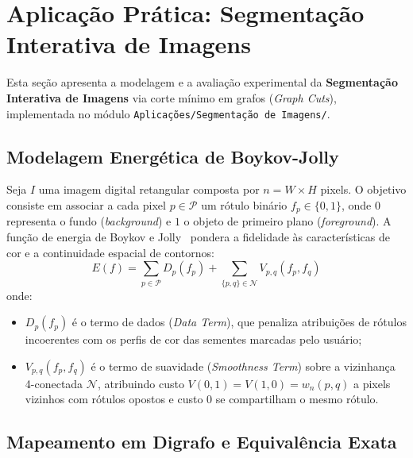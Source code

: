 \section{Aplicação Prática: Segmentação Interativa de Imagens}\label{sec:segmentacao}

Esta seção apresenta a modelagem e a avaliação experimental da \textbf{Segmentação Interativa de Imagens} via corte mínimo em grafos (\textit{Graph Cuts}), implementada no módulo \texttt{Aplicações/Segmentação de Imagens/}.

\subsection{Modelagem Energética de Boykov-Jolly}

Seja $I$ uma imagem digital retangular composta por $n = W \times H$ pixels. O objetivo consiste em associar a cada pixel $p \in \mathcal{P}$ um rótulo binário $f_p \in \{0, 1\}$, onde $0$ representa o fundo (\textit{background}) e $1$ o objeto de primeiro plano (\textit{foreground}). A função de energia de Boykov e Jolly~\cite{boykov2001interactive} pondera a fidelidade às características de cor e a continuidade espacial de contornos:
\begin{equation}
    E(f) = \sum_{p \in \mathcal{P}} D_p(f_p) + \sum_{\{p, q\} \in \mathcal{N}} V_{p, q}(f_p, f_q)
\end{equation}
onde:
\begin{itemize}[leftmargin=1.5em, itemsep=0.15em, topsep=0.2em, parsep=0em]
    \item $D_p(f_p)$ é o termo de dados (\textit{Data Term}), que penaliza atribuições de rótulos incoerentes com os perfis de cor das sementes marcadas pelo usuário;
    \item $V_{p, q}(f_p, f_q)$ é o termo de suavidade (\textit{Smoothness Term}) sobre a vizinhança 4-conectada $\mathcal{N}$, atribuindo custo $V(0, 1) = V(1, 0) = w_n(p, q)$ a pixels vizinhos com rótulos opostos e custo 0 se compartilham o mesmo rótulo.
\end{itemize}

\subsection{Mapeamento em Digrafo e Equivalência Exata}

